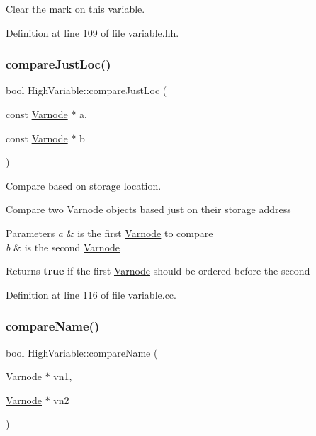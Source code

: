 Clear the mark on this variable. 



Definition at line 109 of file variable.\+hh.

\mbox{\label{class_high_variable_ae010dd1253fe67707a4f1357e6400cc0}} 
\subsubsection{\texorpdfstring{compareJustLoc()}{compareJustLoc()}}
{\footnotesize\ttfamily bool High\+Variable\+::compare\+Just\+Loc (\begin{DoxyParamCaption}\item[{const \mbox{\hyperlink{class_varnode}{Varnode}} $\ast$}]{a,  }\item[{const \mbox{\hyperlink{class_varnode}{Varnode}} $\ast$}]{b }\end{DoxyParamCaption})\hspace{0.3cm}{\ttfamily [static]}}



Compare based on storage location. 

Compare two \mbox{\hyperlink{class_varnode}{Varnode}} objects based just on their storage address 
\begin{DoxyParams}{Parameters}
{\em a} & is the first \mbox{\hyperlink{class_varnode}{Varnode}} to compare \\
\hline
{\em b} & is the second \mbox{\hyperlink{class_varnode}{Varnode}} \\
\hline
\end{DoxyParams}
\begin{DoxyReturn}{Returns}
{\bfseries{true}} if the first \mbox{\hyperlink{class_varnode}{Varnode}} should be ordered before the second 
\end{DoxyReturn}


Definition at line 116 of file variable.\+cc.

\mbox{\label{class_high_variable_ac6a775cce16963a8c0470f9a61ec3fcd}} 
\subsubsection{\texorpdfstring{compareName()}{compareName()}}
{\footnotesize\ttfamily bool High\+Variable\+::compare\+Name (\begin{DoxyParamCaption}\item[{\mbox{\hyperlink{class_varnode}{Varnode}} $\ast$}]{vn1,  }\item[{\mbox{\hyperlink{class_varnode}{Varnode}} $\ast$}]{vn2 }\end{DoxyParamCaption})\hspace{0.3cm}{\ttfamily [static]}}



